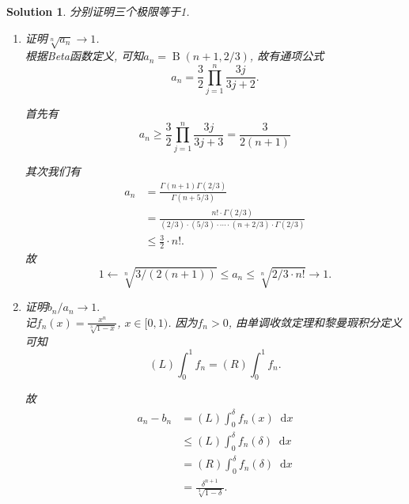 \documentclass[a4paper, 12pt]{ctexart}
\theoremstyle{plain}
\theoremstyle{plain}
\theoremstyle{plain}
\theoremstyle{nonumberplain}
\newtheorem{solution}{Solution}
\DeclareMathOperator*{\Beta}{B}
\newcommand*{\diff}{\mathop{}\!\mathrm{d}}
\begin{document}
    \begin{solution}
        分别证明三个极限等于1.

        \begin{enumerate}[Step i.]
            \item

            证明$\sqrt[n]{a_n}\to 1$.\\
            根据Beta函数定义, 可知$a_n=\Beta(n+1, 2/3)$, 故有通项公式
            \begin{equation}
                a_n = \frac{3}{2}\prod_{j=1}^{n}{\frac{3j}{3j+2}}.
            \end{equation}

            首先有
            \begin{equation}
                \label{angeq}
                a_n
                \geq \frac{3}{2}\prod_{j=1}^{n}{\frac{3j}{3j+3}}
                = \frac{3}{2(n+1)}
            \end{equation}

            其次我们有
            \begin{equation}
            \begin{aligned}
                a_n &= \frac{\Gamma(n+1)\Gamma(2/3)}{\Gamma(n+5/3)}\\
                &= \frac{n!\cdot\Gamma(2/3)}{(2/3)\cdot(5/3)\cdot\dotsm
                    \cdot(n+2/3)\cdot\Gamma(2/3)}\\
                &\leq \frac{3}{2}\cdot n!.
            \end{aligned}
            \end{equation}
            故
            \begin{equation}
                1\leftarrow \sqrt[n]{3/(2(n+1))} \leq a_n
                    \leq \sqrt[n]{2/3\cdot n!} \to 1.
            \end{equation}

            \item

            证明$b_n/a_n\to 1.$\\
            记$\displaystyle f_n(x)=\frac{x^n}{\sqrt[3]{1-x}}$, $x\in [0, 1)$.
            因为$f_n>0$, 由单调收敛定理和黎曼瑕积分定义可知
            \begin{equation}
                (L)\int_{0}^{1}f_n = (R)\int_{0}^{1}f_n.
            \end{equation}

            故
            \begin{equation}
            \begin{aligned}
                a_n-b_n
                &=(L)\int_{0}^{\delta}{f_n(x)\diff x}\\
                &\leq (L)\int_{0}^{\delta}{f_n(\delta)\diff x}\\
                &= (R)\int_{0}^{\delta}{f_n(\delta)\diff x}\\
                &=\frac{\delta^{n+1}}{\sqrt[3]{1-\delta}}.
            \end{aligned}
            \end{equation}


\end{enumerate}
\end{solution}
\end{document}
